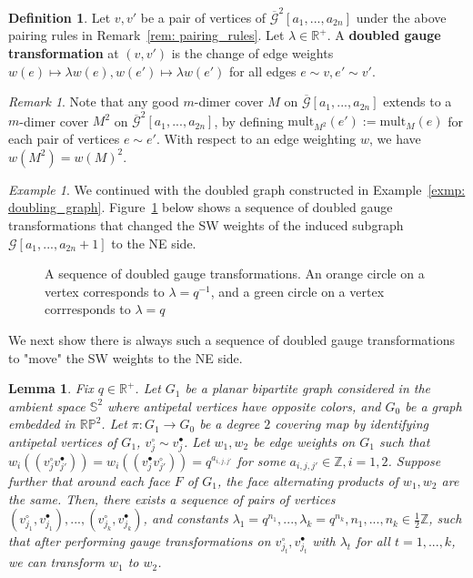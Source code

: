 \documentclass[11pt]{amsart}
\newtheorem{lem}[thm]{Lemma}
\theoremstyle{definition}
\newtheorem{defn}[thm]{Definition}
\theoremstyle{remark}
\newtheorem{exmp}[thm]{Example}
\newtheorem{rem}[thm]{Remark}
\numberwithin{equation}{section}
\begin{document}
\begin{defn}
    Let $v,v'$ be a pair of vertices of $\overline{\mathcal{G}}^2[a_1,...,a_{2n}]$ under the above pairing rules in Remark~\ref{rem: pairing_rules}. Let $\lambda\in\mathbb{R}^+$. A \textbf{doubled gauge transformation} at $(v,v')$ is the change of edge weights $w(e)\mapsto\lambda w(e), w(e')\mapsto\lambda w(e')$ for all edges $e\sim v, e'\sim v'$. 
\end{defn}

\begin{rem}\label{rem:embedding_of_dimers}
    Note that any good $m$-dimer cover $M$ on $\overline{\mathcal{G}}[a_1,...,a_{2n}]$ extends to a $m$-dimer cover $M^2$ on $\overline{\mathcal{G}}^2[a_1,...,a_{2n}]$, by defining $\text{mult}_{M^2}(e') := \text{mult}_{M}(e)$ for each pair of vertices $e\sim e'$. With respect to an edge weighting $w$, we have $w(M^2) = w(M)^2$. 
\end{rem}

\begin{exmp}
    We continued with the doubled graph constructed in Example~\ref{exmp: doubling_graph}. Figure~\ref{fig:doubled_gauge_ex} below shows a sequence of doubled gauge transformations that changed the SW weights of the induced subgraph $\mathcal{G}[a_1,...,a_{2n}+1]$ to the NE side. 
    \begin{figure}[h!]
    \centering
    
    \caption{A sequence of doubled gauge transformations. An orange circle on a vertex corresponds to $\lambda = q^{-1}$, and a green circle on a vertex corrresponds to $\lambda = q$}
    \label{fig:doubled_gauge_ex}
    \end{figure}
\end{exmp}

We next show there is always such a sequence of doubled gauge transformations to "move" the SW weights to the NE side.

\begin{lem}\label{lem: conditions_for_double_gauge}
    Fix $q\in \mathbb{R}^+$. Let $G_1$ be a planar bipartite graph considered in the ambient space $\mathbb{S}^2$ where antipetal vertices have opposite colors, and $G_0$ be a graph embedded in $\mathbb{R}\mathbb{P}^2$. Let $\pi: G_1\rightarrow G_0$ be a degree $2$ covering map by identifying antipetal vertices of $G_1$, $v^\circ_j\sim v^\bullet_j$. Let $w_1,w_2$ be edge weights on $G_1$ such that $w_i((v^\circ_jv^\bullet_{j'}))=w_i((v^\bullet_jv^\circ_{j'})) = q^{a_{i,j,j'}}$ for some $a_{i,j,j'}\in\mathbb{Z}, i=1,2$. Suppose further that around each face $F$ of $G_1$, the face alternating products of $w_1,w_2$ are the same. Then, there exists a sequence of pairs of vertices $(v^\circ_{j_1}, v^\bullet_{j_1}),...,(v^\circ_{j_k}, v^\bullet_{j_k})$, and constants $\lambda_1=q^{n_1},...,\lambda_k = q^{n_k}, n_1,...,n_k\in \frac{1}{2}\mathbb{Z}$, such that after performing gauge transformations on $v^\circ_{j_t}, v^\bullet_{j_t}$ with $\lambda_t$ for all $t=1,...,k$, we can transform $w_1$ to $w_2$. 
\end{lem}
\end{document}
